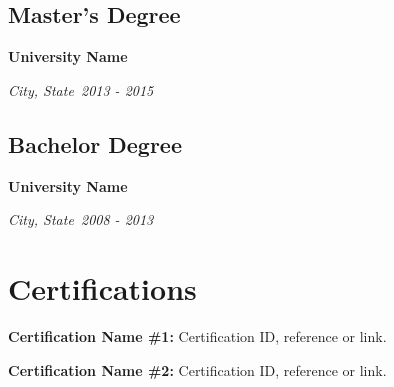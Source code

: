\documentclass[letterpaper,10pt]{article}
\newcommand{\jobDetails}[4]
{
    {\bfseries#1}

    \textit{#2, #3~\hfill#4}

    \vspace{5pt}
}
\begin{document}
\subsection{Master's Degree}
\jobDetails{University Name}{City}{State}{2013 - 2015}
\lipsum[6][6-9]

\subsection{Bachelor Degree}
\jobDetails{University Name}{City}{State}{2008 - 2013}
\lipsum[7][1-9]

\section{Certifications}
\textbf{Certification Name \#1:} Certification ID, reference or link.

\textbf{Certification Name \#2:} Certification ID, reference or link.
\end{document}
